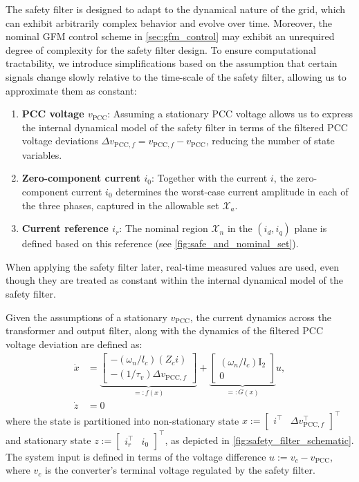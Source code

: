 \documentclass[lettersize,journal]{IEEEtran}
\begin{document}
The safety filter is designed to adapt to the dynamical nature of the grid, which can exhibit arbitrarily complex behavior and evolve over time.
Moreover, the nominal GFM control scheme in \cref{sec:gfm_control} may exhibit an unrequired degree of complexity for the safety filter design.
To ensure computational tractability, we introduce simplifications based on the assumption that certain signals change slowly relative to the time-scale of the safety filter, allowing us to approximate them as constant:
\begin{enumerate}
   \item \textbf{PCC voltage $v_\text{PCC}$}: 
   Assuming a stationary PCC voltage allows us to express the internal dynamical model of the safety filter in terms of the filtered PCC voltage deviations $\Delta v_{\text{PCC},f} = v_{\text{PCC},f} - v_{\text{PCC}}$, reducing the number of state variables.
   \item \textbf{Zero-component current $i_0$}:
   Together with the current $i$, the zero-component current $i_0$ determines the worst-case current amplitude in each of the three phases, captured in the allowable set $\mathcal X_a$.
   \item \textbf{Current reference $i_r$}: 
   The nominal region $\mathcal X_n$ in the $(i_d, i_q)$ plane is defined based on this reference (see \cref{fig:safe_and_nominal_set}).
\end{enumerate}
When applying the safety filter later, real-time measured values are used, even though they are treated as constant within the internal dynamical model of the safety filter.

Given the assumptions of a stationary $v_\text{PCC}$, 
the current dynamics across the transformer and output filter, along with the dynamics of the filtered PCC voltage deviation are defined as:
\begin{subequations} \label{eq:simplified_system}
   \begin{align}
      \dot x &= \underbrace{\begin{bmatrix}
         -(\omega_n / l_c) \left( Z_c i \right) \\
         -(1/\tau_v) \Delta v_{\mathrm{PCC},f}
      \end{bmatrix}}_{=:f(x)} + \underbrace{\begin{bmatrix}
         (\omega_n / l_c) \mathrm{I}_2 \\ \mathrm{0}
      \end{bmatrix}}_{=:G(x)} u, \\
      \dot z &= 0
   \end{align}
\end{subequations}
where the state is partitioned into non-stationary state $x := \begin{bmatrix}i^\top & \Delta v_{\text{PCC},f}^\top \end{bmatrix}^\top$ and stationary state $z := \begin{bmatrix}i_r^\top & i_0 \end{bmatrix}^\top$, as depicted in \cref{fig:safety_filter_schematic}.
The system input is defined in terms of the voltage difference $u := v_c - v_\text{PCC}$, where $v_c$ is the converter's terminal voltage regulated by the safety filter.
\end{document}
